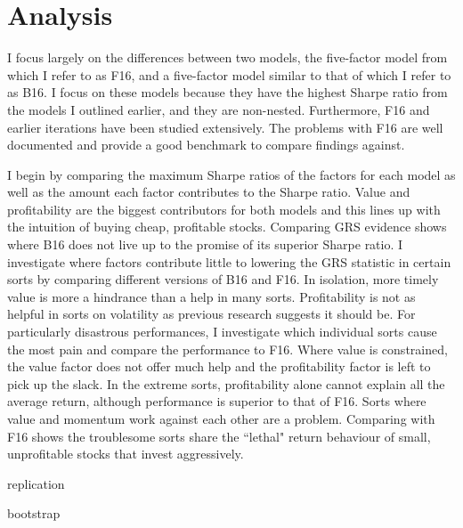 
\section{Analysis}

I focus largely on the differences between two models, the five-factor model from
\textcite{fama2016dissecting} which I refer to as F16, and a five-factor model similar to
that of \textcite{ball2016accruals} which I refer to as B16. I focus on these models
because they have the highest Sharpe ratio from the models I outlined earlier, and they
are non-nested. Furthermore, F16 and earlier iterations have been studied extensively. The
problems with F16 are well documented and provide a good benchmark to compare findings
against.

I begin by comparing the maximum Sharpe ratios of the factors for each model as well as
the amount each factor contributes to the Sharpe ratio. Value and profitability are the
biggest contributors for both models and this lines up with the intuition of buying cheap,
profitable stocks. Comparing GRS evidence shows where B16 does not live up to the promise
of its superior Sharpe ratio. I investigate where factors contribute little to lowering
the GRS statistic in certain sorts by comparing different versions of B16 and F16. In
isolation, more timely value is more a hindrance than a help in many sorts. Profitability
is not as helpful in sorts on volatility as previous research
\parencite{novy2014understanding} suggests it should be. For particularly disastrous
performances, I investigate which individual sorts cause the most pain and compare the
performance to F16. Where value is constrained, the value factor does not offer much help
and the profitability factor is left to pick up the slack. In the extreme sorts,
profitability alone cannot explain all the average return, although performance is
superior to that of F16. Sorts where value and momentum work against each other are a
problem. Comparing with F16 shows the troublesome sorts share the ``lethal" return
behaviour of small, unprofitable stocks that invest aggressively.

{replication}

{bootstrap}




